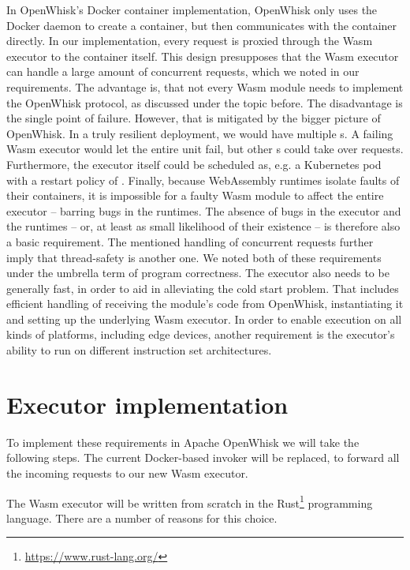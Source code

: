 In OpenWhisk's Docker container implementation, OpenWhisk only uses the Docker daemon to create a container, but then communicates with the container directly. In our implementation, every request is proxied through the Wasm executor to the container itself. This design presupposes that the Wasm executor can handle a large amount of concurrent requests, which we noted in our requirements. The advantage is, that not every Wasm module needs to implement the OpenWhisk protocol, as discussed under the  topic before. The disadvantage is the single point of failure. However, that is mitigated by the bigger picture of OpenWhisk. In a truly resilient deployment, we would have multiple s. A failing Wasm executor would let the entire  unit fail, but other s could take over requests. Furthermore, the executor itself could be scheduled as, e.g. a Kubernetes pod with a restart policy of . Finally, because WebAssembly runtimes isolate faults of their containers, it is impossible for a faulty Wasm module to affect the entire executor -- barring bugs in the runtimes. The absence of bugs in the executor and the runtimes -- or, at least as small likelihood of their existence -- is therefore also a basic requirement. The mentioned handling of concurrent requests further imply that thread-safety is another one. We noted both of these requirements under the umbrella term of program correctness.
The executor also needs to be generally fast, in order to aid in alleviating the cold start problem. That includes efficient handling of receiving the module's code from OpenWhisk, instantiating it and setting up the underlying Wasm executor. In order to enable execution on all kinds of platforms, including edge devices, another requirement is the executor's ability to run on different instruction set architectures.


\section{Executor implementation}


To implement these requirements in Apache OpenWhisk we will take the following steps. The current Docker-based invoker will be replaced, to forward all the incoming requests to our new Wasm executor.

The Wasm executor will be written from scratch in the Rust\footnote{\url{https://www.rust-lang.org/}} programming language. There are a number of reasons for this choice.


